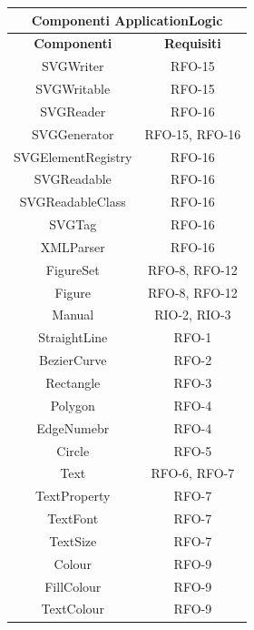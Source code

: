 \begin{table}[h]
\begin{center}
     \begin{tabular}
           {@{\extracolsep{\fill}}|c|c|}
      		\hline
           \multicolumn{2}{|c|}{ \textbf{Componenti ApplicationLogic} } \\
     \hline
      \textbf{Componenti} & \textbf{Requisiti} \\
      \hline
     SVGWriter & RFO-15 \\
     \hline
     SVGWritable & RFO-15\\
     \hline
     SVGReader & RFO-16\\
     \hline
     SVGGenerator & RFO-15, RFO-16\\
     \hline
     SVGElementRegistry & RFO-16\\
     \hline
     SVGReadable & RFO-16\\
     \hline
     SVGReadableClass & RFO-16\\
     \hline
     SVGTag & RFO-16\\
     \hline
     XMLParser & RFO-16\\
     \hline
     FigureSet & RFO-8, RFO-12 \\
     \hline
     Figure & RFO-8, RFO-12 \\
     \hline
     Manual & RIO-2, RIO-3 \\
     \hline
     StraightLine & RFO-1 \\
     \hline
     BezierCurve & RFO-2 \\
     \hline
     Rectangle & RFO-3 \\
     \hline
     Polygon & RFO-4 \\ 
     \hline
     EdgeNumebr & RFO-4 \\
     \hline
     Circle & RFO-5 \\
     \hline
     Text & RFO-6, RFO-7 \\
     \hline
     TextProperty & RFO-7 \\
     \hline
     TextFont & RFO-7 \\
     \hline
     TextSize & RFO-7\\
     \hline
     Colour & RFO-9 \\
     \hline
     FillColour & RFO-9 \\
     \hline
     TextColour & RFO-9 \\
     \hline

\end{tabular}
\end{center}
\end{table}
